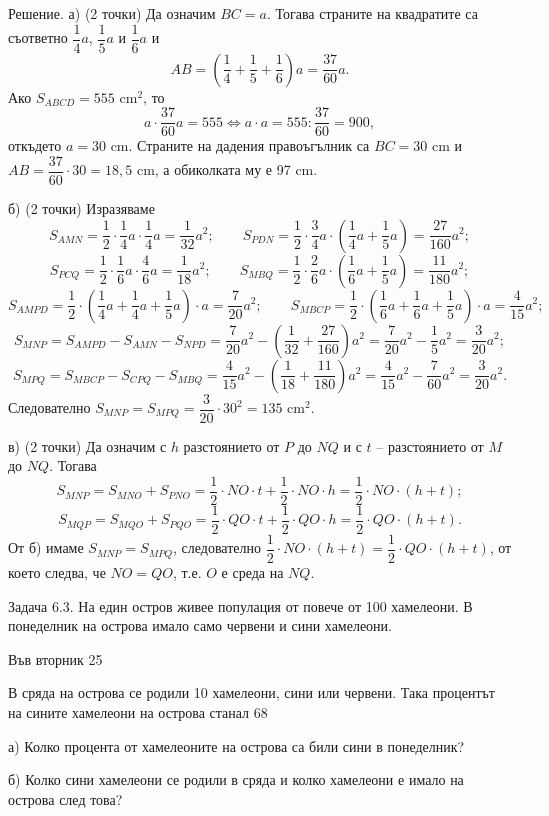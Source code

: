 Решение. а) (2 точки) Да означим $BC=a$. Тогава страните на квадратите са съответно $\dfrac14a$, $\dfrac15a$ и $\dfrac16a$ и
$$
AB=\left(\frac14+\frac15+\frac16\right)a=\frac{37}{60}a.
$$
Ако $S_{ABCD}=555$ cm$^2$, то
$$
a\cdot\frac{37}{60}a=555\Longleftrightarrow a\cdot a=555:\frac{37}{60}=900,
$$
откъдето $a=30$ cm. Страните на дадения правоъгълник са $BC=30$ cm и $AB=\dfrac{37}{60}\cdot30=18{,}5$ cm, а обиколката му е 97 cm.

б) (2 точки) Изразяваме
$$
S_{AMN}=\frac12\cdot\frac14a\cdot\frac14a=\frac1{32}a^2;\qquad
S_{PDN}=\frac12\cdot\frac34a\cdot\left(\frac14a+\frac15a\right)=\frac{27}{160}a^2;
$$
$$
S_{PCQ}=\frac12\cdot\frac16a\cdot\frac46a=\frac1{18}a^2;\qquad
S_{MBQ}=\frac12\cdot\frac26a\cdot\left(\frac16a+\frac15a\right)=\frac{11}{180}a^2;
$$
$$
S_{AMPD}=\frac12\cdot\left(\frac14a+\frac14a+\frac15a\right)\cdot a=\frac7{20}a^2;\qquad
S_{MBCP}=\frac12\cdot\left(\frac16a+\frac16a+\frac15a\right)\cdot a=\frac4{15}a^2;
$$
$$
S_{MNP}=S_{AMPD}-S_{AMN}-S_{NPD}=\frac7{20}a^2-\left(\frac1{32}+\frac{27}{160}\right)a^2=\frac7{20}a^2-\frac15a^2=\frac3{20}a^2;
$$
$$
S_{MPQ}=S_{MBCP}-S_{CPQ}-S_{MBQ}=\frac4{15}a^2-\left(\frac1{18}+\frac{11}{180}\right)a^2=\frac4{15}a^2-\frac7{60}a^2=\frac3{20}a^2.
$$
Следователно $S_{MNP}=S_{MPQ}=\dfrac3{20}\cdot30^2=135$ cm$^2$.

в) (2 точки) Да означим с $h$ разстоянието от $P$ до $NQ$ и с $t$ – разстоянието от $M$ до $NQ$. Тогава
$$
S_{MNP}=S_{MNO}+S_{PNO}=\frac12\cdot NO\cdot t+\frac12\cdot NO\cdot h=\frac12\cdot NO\cdot(h+t);
$$
$$
S_{MQP}=S_{MQO}+S_{PQO}=\frac12\cdot QO\cdot t+\frac12\cdot QO\cdot h=\frac12\cdot QO\cdot(h+t).
$$
От б) имаме $S_{MNP}=S_{MPQ}$, следователно $\dfrac12\cdot NO\cdot(h+t)=\dfrac12\cdot QO\cdot(h+t)$, от което следва, че $NO=QO$, т.е. $O$ е среда на $NQ$.

Задача 6.3. На един остров живее популация от повече от 100 хамелеони. В понеделник на острова имало само червени и сини хамелеони.

Във вторник 25%

В сряда на острова се родили 10 хамелеони, сини или червени. Така процентът на сините хамелеони на острова станал 68%

а) Колко процента от хамелеоните на острова са били сини в понеделник?

б) Колко сини хамелеони се родили в сряда и колко хамелеони е имало на острова след това?

